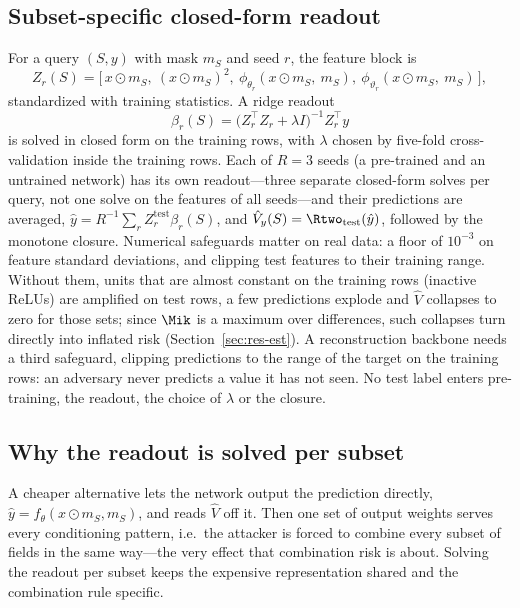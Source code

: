 \subsection{Subset-specific closed-form readout}
For a query $(S,y)$ with mask $m_S$ and seed $r$, the feature block is
\begin{equation}
Z_{r}(S) = \big[\, x\odot m_S,\ (x \odot m_S)^{2},\ \phi_{\theta_r}(x\odot m_S,\ m_S),\ \phi_{\vartheta_r}(x\odot m_S,\ m_S) \,\big],
\end{equation}
standardized with training statistics. A ridge readout
\begin{equation}\label{eq:ridge}
\beta_{r}(S) = \big(Z_r^{\top} Z_r + \lambda I\big)^{-1} Z_r^{\top} y
\end{equation}
is solved in closed form on the training rows, with $\lambda$ chosen by five-fold
cross-validation inside the training rows. Each of $R=3$ seeds (a pre-trained and an untrained network) has its own
readout---three separate closed-form solves per query, not one solve on the features of all seeds---and their
predictions are averaged, $\hat y = R^{-1}\sum_r Z_r^{\mathrm{test}}\beta_r(S)$, and
$\hat V_y(S)=\Rtwo_{\mathrm{test}}(\hat y)$, followed by the monotone closure. Numerical
safeguards matter on real data: a floor of $10^{-3}$ on feature standard deviations, and
clipping test features to their training range. Without them, units that are almost constant
on the training rows (inactive ReLUs) are amplified on test rows, a few predictions explode and
$\hat V$ collapses to zero for those sets; since $\Mik$ is a maximum over differences, such
collapses turn directly into inflated risk (Section~\ref{sec:res-est}). A reconstruction backbone
needs a third safeguard, clipping predictions to the range of the target on the training rows: an adversary never
predicts a value it has not seen. No test label enters
pre-training, the readout, the choice of $\lambda$ or the closure.

\subsection{Why the readout is solved per subset}
A cheaper alternative lets the network output the prediction directly, $\hat y=f_\theta(x\odot
m_S, m_S)$, and reads $\hat V$ off it. Then one set of output weights serves every
conditioning pattern, i.e.\ the attacker is forced to combine every subset of fields in the
same way---the very effect that combination risk is about. Solving the readout per subset
keeps the expensive representation shared and the combination rule specific.

